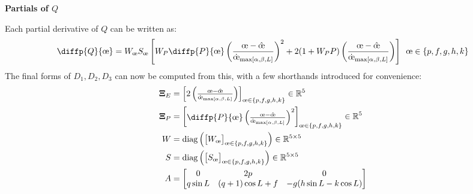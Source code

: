 \textbf{Partials of $Q$}

Each partial derivative of $Q$ can be written as:
\begin{equation*}
  \diffp{Q}{{\moe}} = W_{\moe} S_{\moe} \left[ W_P\diffp{P}{{\moe}}\left(\frac{\moe - \hat{\moe}}{\dot{\moe}_{\maxrocall}} \right)^2 + 2 (1+W_P P) \left(\frac{\moe - \hat{\moe}}{\dot{\moe}_{\maxrocall}} \right) \right] \ \, \moe \in \{p, f, g, h, k\}
\end{equation*}
The final forms of $D_1, D_2, D_3$ can now be computed from this, with a few shorthands introduced for convenience:
\begin{align*}
  \boldsymbol{\Xi}_E & = \begin{bmatrix}
                           2  \left(\frac{\moe - \hat{\moe}}{\dot{\moe}_{\maxrocall}} \right)
                         \end{bmatrix}_{\moe \in \{p, f, g, h, k\}} \in \mathbb{R}^5                                                 \\
  \boldsymbol{\Xi}_P & = \begin{bmatrix}
                           \diffp{P}{{\moe}}\left(\frac{\moe - \hat{\moe}}{\dot{\moe}_{\maxrocall}} \right)^2
                         \end{bmatrix}_{\moe \in \{p, f, g, h, k\}} \in \mathbb{R}^5 \\
  W                  & = \mathrm{diag} \left(\begin{bmatrix}
                                               W_{\moe}
                                             \end{bmatrix}_{\moe \in \{p, f, g, h, k\}} \right) \in \mathbb{R}^{5 \times 5}                                                                                              \\
  S                  & = \mathrm{diag} \left(\begin{bmatrix}
                                               S_{\moe}
                                             \end{bmatrix}_{\moe \in \{p, f, g, h, k\}}\right)  \in \mathbb{R}^{5 \times 5}                                                                                              \\
  A                  & =
  \begin{bmatrix}
    0        & 2p               & 0                                 \\
    q\sin L  & (q+1) \cos L + f & -g(h \sin L - k \cos L)           \\

\end{bmatrix}
\end{align*}
